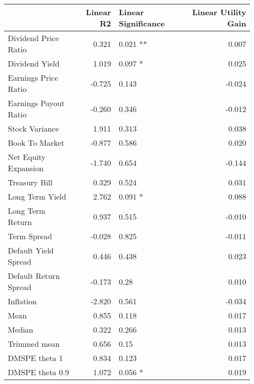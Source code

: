 \begin{tabular}{lrlr}
\toprule
{} &  Linear R2 & Linear Significance &  Linear Utility Gain \\
\midrule
Dividend Price Ratio  &      0.321 &            0.021 ** &                0.007 \\
Dividend Yield        &      1.019 &             0.097 * &                0.025 \\
Earnings Price Ratio  &     -0.725 &              0.143  &               -0.024 \\
Earnings Payout Ratio &     -0.260 &              0.346  &               -0.012 \\
Stock Variance        &      1.911 &              0.313  &                0.038 \\
Book To Market        &     -0.877 &              0.586  &                0.020 \\
Net Equity Expansion  &     -1.740 &              0.654  &               -0.144 \\
Treasury Bill         &      0.329 &              0.524  &                0.031 \\
Long Term Yield       &      2.762 &             0.091 * &                0.088 \\
Long Term Return      &      0.937 &              0.515  &               -0.010 \\
Term Spread           &     -0.028 &              0.825  &               -0.011 \\
Default Yield Spread  &      0.446 &              0.438  &                0.023 \\
Default Return Spread &     -0.173 &               0.28  &                0.010 \\
Inflation             &     -2.820 &              0.561  &               -0.034 \\
Mean                  &      0.855 &              0.118  &                0.017 \\
Median                &      0.322 &              0.266  &                0.013 \\
Trimmed mean          &      0.656 &               0.15  &                0.013 \\
DMSPE theta 1         &      0.834 &              0.123  &                0.017 \\
DMSPE theta 0.9       &      1.072 &             0.056 * &                0.019 \\
\bottomrule
\end{tabular}
